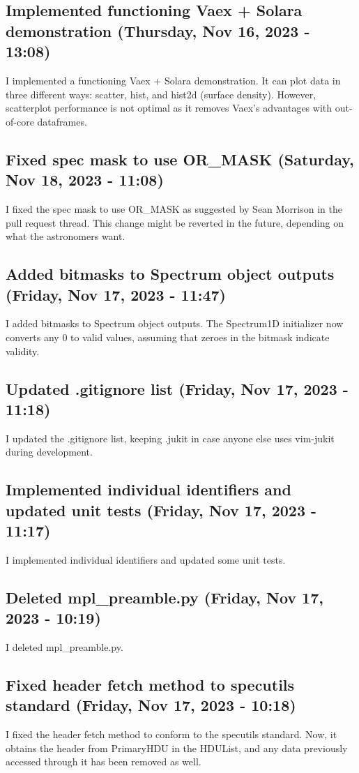 \documentclass[a4paper]{article}
\begin{document}
\subsection*{Implemented functioning Vaex + Solara demonstration (Thursday, Nov 16, 2023 - 13:08)}
I implemented a functioning Vaex + Solara demonstration. It can plot data in three different ways: scatter, hist, and hist2d (surface density). However, scatterplot performance is not optimal as it removes Vaex's advantages with out-of-core dataframes.


\subsection*{Fixed spec mask to use OR\_MASK (Saturday, Nov 18, 2023 - 11:08)}
I fixed the spec mask to use OR\_MASK as suggested by Sean Morrison in the pull request thread. This change might be reverted in the future, depending on what the astronomers want.

\subsection*{Added bitmasks to Spectrum object outputs (Friday, Nov 17, 2023 - 11:47)}
I added bitmasks to Spectrum object outputs. The Spectrum1D initializer now converts any 0 to valid values, assuming that zeroes in the bitmask indicate validity.

\subsection*{Updated .gitignore list (Friday, Nov 17, 2023 - 11:18)}
I updated the .gitignore list, keeping .jukit in case anyone else uses vim-jukit during development.

\subsection*{Implemented individual identifiers and updated unit tests (Friday, Nov 17, 2023 - 11:17)}
I implemented individual identifiers and updated some unit tests.

\subsection*{Deleted mpl\_preamble.py (Friday, Nov 17, 2023 - 10:19)}
I deleted mpl\_preamble.py.

\subsection*{Fixed header fetch method to specutils standard (Friday, Nov 17, 2023 - 10:18)}
I fixed the header fetch method to conform to the specutils standard. Now, it obtains the header from PrimaryHDU in the HDUList, and any data previously accessed through it has been removed as well.
\end{document}
